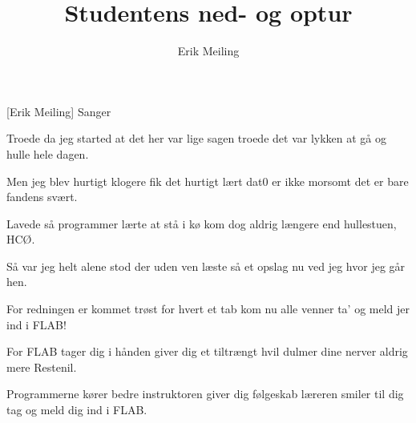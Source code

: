 \documentclass[a4paper,11pt]{article}
\title{Studentens ned- og optur}
\author{Erik Meiling}
\begin{document}
\maketitle

\begin{roles}
[Erik Meiling] Sanger
\end{roles}

\begin{song}
Troede da jeg started
at det her var lige sagen
troede det var lykken
at gå og hulle hele dagen.

Men jeg blev hurtigt klogere
fik det hurtigt lært
dat0 er ikke morsomt
det er bare fandens svært.

Lavede så programmer
lærte at stå i kø
kom dog aldrig længere
end hullestuen, HCØ.

Så var jeg helt alene
stod der uden ven
læste så et opslag
nu ved jeg hvor jeg går hen.

For redningen er kommet
trøst for hvert et tab
kom nu alle venner
ta' og meld jer ind i FLAB!

For FLAB tager dig i hånden
giver dig et tiltrængt hvil
dulmer dine nerver
aldrig mere Restenil.

Programmerne kører bedre
instruktoren giver dig følgeskab
læreren smiler til dig
tag og meld dig ind i FLAB.
\end{song}
\end{document}
